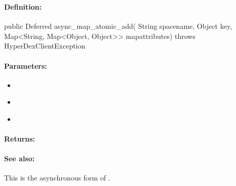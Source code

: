 \pagebreak
\subsubsection{}
\label{api:java:async_map_atomic_add}


\paragraph{Definition:}
\begin{javacode}
public Deferred async_map_atomic_add(
        String spacename,
        Object key,
        Map<String, Map<Object, Object>> mapattributes) throws HyperDexClientException
\end{javacode}

\paragraph{Parameters:}
\begin{itemize}[noitemsep]
\item {}\\

\item {}\\

\item {}\\

\end{itemize}

\paragraph{Returns:}


\paragraph{See also:}  This is the asynchronous form of .

\pagebreak
\subsubsection{}
\label{api:java:cond_map_atomic_add}


